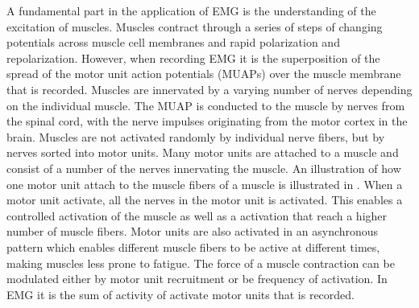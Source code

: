 
A fundamental part in the application of EMG is the understanding of the excitation of muscles. Muscles contract through a series of steps of changing potentials across muscle cell membranes and rapid polarization and repolarization. However, when recording EMG it is the superposition of the spread of the motor unit action potentials (MUAPs) over the muscle membrane that is recorded. \cite{Cram2012} 
Muscles are innervated by a varying number of nerves depending on the individual muscle. The MUAP is conducted to the muscle by nerves from the spinal cord, with the nerve impulses originating from the motor cortex in the brain. Muscles are not activated randomly by individual nerve fibers, but by nerves sorted into motor units. Many motor units are attached to a muscle and consist of a number of the nerves innervating the muscle. An illustration of how one motor unit attach to the muscle fibers of a muscle is illustrated in . When a motor unit activate, all the nerves in the motor unit is activated. This enables a controlled activation of the muscle as well as a activation that reach a higher number of muscle fibers. Motor units are also activated in an asynchronous pattern which enables different muscle fibers to be active at different times, making muscles less prone to fatigue. %
The force of a muscle contraction can be modulated either by motor unit recruitment or be frequency of activation. In EMG it is the sum of activity of activate motor units that is recorded. \cite{Cram2012}

